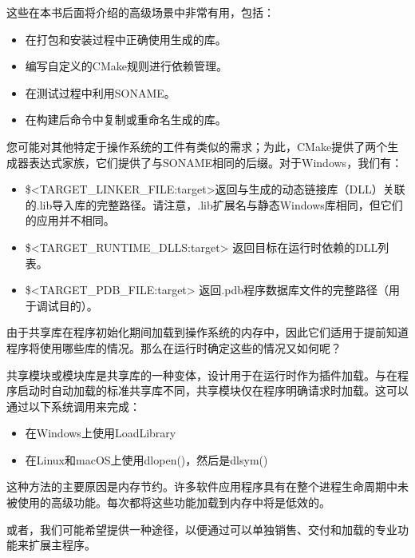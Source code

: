 这些在本书后面将介绍的高级场景中非常有用，包括：

\begin{itemize}
\item
在打包和安装过程中正确使用生成的库。

\item
编写自定义的CMake规则进行依赖管理。

\item
在测试过程中利用SONAME。

\item
在构建后命令中复制或重命名生成的库。
\end{itemize}

您可能对其他特定于操作系统的工件有类似的需求；为此，CMake提供了两个生成器表达式家族，它们提供了与SONAME相同的后缀。对于Windows，我们有：

\begin{itemize}
\item
\$<TARGET\_LINKER\_FILE:target>返回与生成的动态链接库（DLL）关联的.lib导入库的完整路径。请注意，.lib扩展名与静态Windows库相同，但它们的应用并不相同。

\item
\$<TARGET\_RUNTIME\_DLLS:target> 返回目标在运行时依赖的DLL列表。

\item
\$<TARGET\_PDB\_FILE:target> 返回.pdb程序数据库文件的完整路径（用于调试目的）。
\end{itemize}

由于共享库在程序初始化期间加载到操作系统的内存中，因此它们适用于提前知道程序将使用哪些库的情况。那么在运行时确定这些的情况又如何呢？


共享模块或模块库是共享库的一种变体，设计用于在运行时作为插件加载。与在程序启动时自动加载的标准共享库不同，共享模块仅在程序明确请求时加载。这可以通过以下系统调用来完成：

\begin{itemize}
\item
在Windows上使用LoadLibrary

\item
在Linux和macOS上使用dlopen()，然后是dlsym()
\end{itemize}

这种方法的主要原因是内存节约。许多软件应用程序具有在整个进程生命周期中未被使用的高级功能。每次都将这些功能加载到内存中将是低效的。

或者，我们可能希望提供一种途径，以便通过可以单独销售、交付和加载的专业功能来扩展主程序。

